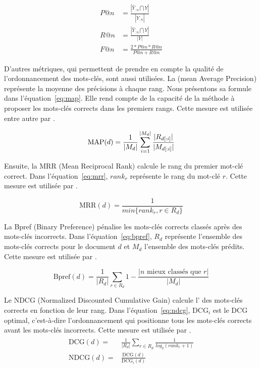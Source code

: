 \begin{align}\label{eq:precision}
  P@n & = \frac{|\hat{Y}_{:n} \bigcap Y|}{|\hat{Y}_{:n}|} \\\label{eq:rappel}
  R@n & = \frac{|\hat{Y}_{:n} \bigcap Y|}{|Y|} \\\label{eq:fmesure}
  F@n & = \frac{2 * P@n * R@n}{P@n + R@n}
\end{align}

D'autres métriques, qui permettent de prendre en compte la qualité de l'ordonnancement des mots-clés, sont aussi utilisées.
La \map{} (mean Average Precision) représente la moyenne des précisions à chaque rang. Nous présentons sa formule dans l'équation~\ref{eq:map}. Elle rend compte de la capacité de la méthode à proposer les mots-clés corrects dans les premiers rangs. Cette mesure est utilisée entre autre par \citet{basaldella_evaluating_2016,boudin_unsupervised_2018,gallina_large-scale_2020}.

\begin{equation}\label{eq:map}
    \text{MAP}(d) = \frac{1}{|M_d|} \sum_{i=1}^{|M_d|} \frac{|R_{d[:i]}|}{|M_{d[:i]}|}
\end{equation}

Ensuite, la MRR (Mean Reciprocal Rank) calcule le rang du premier mot-clé correct. Dans l'équation~\ref{eq:mrr},  $rank_r$ représente le rang du mot-clé $r$. Cette mesure est utilisée par \citet{liu_automatic_2010}.

\begin{equation}\label{eq:mrr}
    \text{MRR}(d) = \frac{1}{min \{rank_r, r\in{R_d}\}}
\end{equation}

La Bpref (Binary Preference) pénalise les mots-clés corrects classés après des mots-clés incorrects. Dans l'équation~\ref{eq:bpref}, $R_d$ représente l'ensemble des mots-clés corrects pour le document $d$ et $M_d$ l'ensemble des mots-clés prédits. Cette mesure est utilisée par \citet{liu_automatic_2010}.

\begin{equation}\label{eq:bpref}
    \text{Bpref}(d) = \frac{1}{|R_d|}\sum_{r\in{}R_d} 1 - \frac{|n \text{ mieux classés que } r|}{|M_d|}
\end{equation}

Le NDCG (Normalized Discounted Cumulative Gain) calcule l' des mots-clés corrects en fonction de leur rang. Dans l'équation~\ref{eq:ndcg}, $\text{DCG}_i$ est le DCG optimal, c'est-à-dire l'ordonnancement qui positionne tous les mots-clés corrects avant les mots-clés incorrects. Cette mesure est utilisée par \citet{marujo_supervised_2012,chen_keyphrase_2018}.
\begin{align}
\begin{split}\label{eq:ndcg}
    \text{DCG}(d) = & \frac{1}{|R_d|}\sum_{r\in{}R_d} \frac{1}{log_2(rank_r+1)} \\
    \text{NDCG}(d) = & \frac{\text{DCG}(d)}{\text{DCG}_i(d)}
\end{split}
\end{align}

